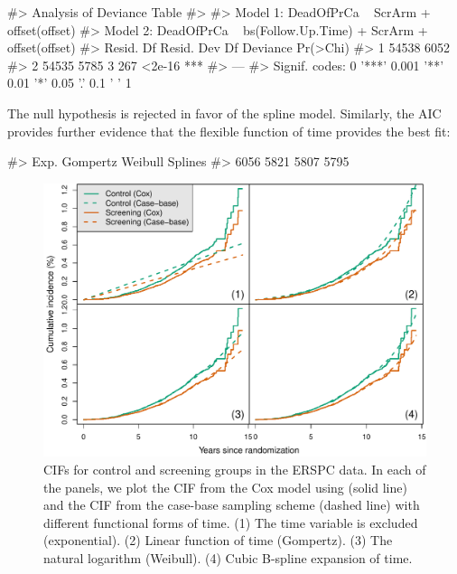 \begin{Schunk}
\begin{Soutput}
#> Analysis of Deviance Table
#> 
#> Model 1: DeadOfPrCa ~ ScrArm + offset(offset)
#> Model 2: DeadOfPrCa ~ bs(Follow.Up.Time) + ScrArm + offset(offset)
#>   Resid. Df Resid. Dev Df Deviance Pr(>Chi)    
#> 1     54538       6052                         
#> 2     54535       5785  3      267   <2e-16 ***
#> ---
#> Signif. codes:  0 '***' 0.001 '**' 0.01 '*' 0.05 '.' 0.1 ' ' 1
\end{Soutput}
\end{Schunk}

The null hypothesis is rejected in favor of the spline model. Similarly,
the AIC provides further evidence that the flexible function of time
provides the best fit:

\begin{Schunk}
\begin{Soutput}
#>     Exp. Gompertz  Weibull  Splines 
#>     6056     5821     5807     5795
\end{Soutput}
\end{Schunk}

\begin{Schunk}
\begin{figure}[ht]
\includegraphics[width=\textwidth,keepaspectratio=true]{../figures/erspc-cox-cif-1} \caption{CIFs for control and screening groups in the ERSPC data. In each of the panels, we plot the CIF from the Cox model using  (solid line) and the CIF from the case-base sampling scheme (dashed line) with different functional forms of time. (1) The time variable is excluded (exponential). (2) Linear function of time (Gompertz). (3) The natural logarithm (Weibull). (4) Cubic B-spline expansion of time.}\label{fig:erspc-cox-cif}
\end{figure}
\end{Schunk}


